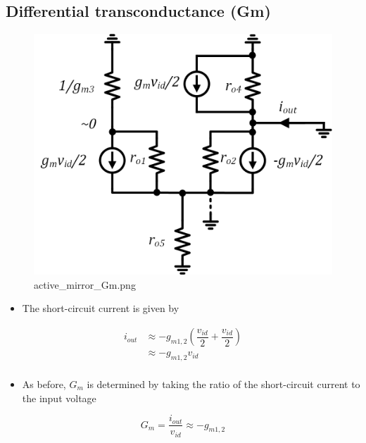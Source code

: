 \documentclass[11pt]{article}
\providecommand{\tightlist}{%
      \setlength{\itemsep}{0pt}\setlength{\parskip}{0pt}}
\begin{document}
    \hypertarget{differential-transconductance-gm}{%
\subsection{Differential transconductance
(Gm)}\label{differential-transconductance-gm}}

    \begin{figure}
\centering
\includegraphics{active_mirror_Gm.png}
\caption{active\_mirror\_Gm.png}
\end{figure}

    \begin{itemize}
\tightlist
\item
  The short-circuit current is given by
\end{itemize}

\begin{align}
i_{out} &\approx -g_{m1,2} \left( \dfrac{v_{id}}{2} + \dfrac{v_{id}}{2} \right) \\
&\approx -g_{m1,2} v_{id} \\
\end{align}

\begin{itemize}
\tightlist
\item
  As before, \(G_m\) is determined by taking the ratio of the
  short-circuit current to the input voltage
\end{itemize}

\begin{equation}
\boxed{G_m = \dfrac{i_{out}}{v_{id}} \approx -g_{m1,2}}
\end{equation}
\end{document}

